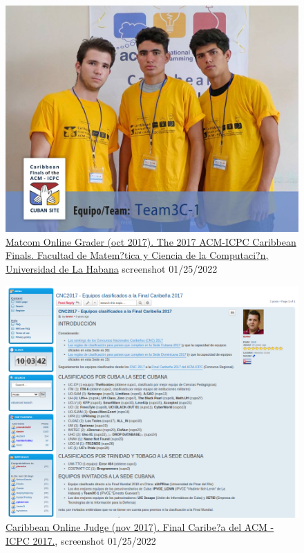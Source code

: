 \begin{figure}[h]
    \centering
    \includegraphics[width=\textwidth]{images/team3c.jpg}
    \caption{\href{https://matcomgrader.com/post/5167/the-2017-acm-icpc-caribbean-finals}{Matcom Online Grader (oct 2017). The 2017 ACM-ICPC Caribbean Finals. Facultad de Matem?tica y Ciencia de la Computaci?n, Universidad de La Habana} screenshot 01/25/2022}
    \label{sec:3c}
\end{figure}
\begin{figure}[h]
    \centering
    \includegraphics[width=\textwidth]{images/icpc_classified.png}
    \caption{\href{ https://coj-forum.uci.cu/viewtopic.php?t=3315}{Caribbean Online Judge (nov 2017). Final Caribe?a del ACM - ICPC 2017.}, screenshot 01/25/2022}
    \label{sec:icpc}
\end{figure}

